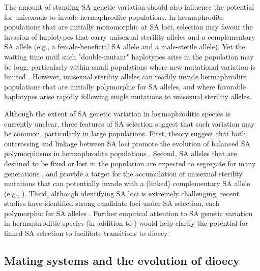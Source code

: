 \documentclass{article}
\begin{document}
The amount of standing SA genetic variation should also influence the potential for unisexuals to invade hermaphrodite populations. In hermaphrodite populations that are initially monomorphic at SA loci, selection may favour the invasion of haplotypes that carry unisexual sterility alleles and a complementary SA allele (e.g., a female-beneficial SA allele and a male-sterile allele). Yet the waiting time until such "double-mutant" haplotypes arise in the population may be long, particularly within small populations where new mutational variation is limited \citep{WeinreichChao2005,ConnallonClark2010}. However, unisexual sterility alleles can readily invade hermaphrodite populations that are initially polymorphic for SA alleles, and where favorable haplotypes arise rapidly following single mutations to unisexual sterility alleles. 

Although the extent of SA genetic variation in hermaphroditic species is currently unclear, three features of SA selection suggest that such variation may be common, particularly in large populations. First, theory suggest that both outcrossing and linkage between SA loci promote the evolution of balanced SA polymorphisms in hermaphrodite populations \citep{ JordanConnallon2014,Olito2016}. Second, SA alleles that are destined to be fixed or lost in the population are expected to segregate for many generations \citep{ConnallonClark2012}, and provide a target for the accumulation of unisexual sterility mutations that can potentially invade with a (linked) complementary SA allele (e.g., \citealt{WeinreichChao2005}). Third, although identifying SA loci is extremely challenging, recent studies have identified strong candidate loci under SA selection, each polymorphic for SA alleles \citep{Barson2015,LeeKelly2015, Mank2017}. Further empirical attention to SA genetic variation in hermaphroditic species (in addition to \citealt{LeeKelly2015}) would help clarify the potential for linked SA selection to facilitate transitions to dioecy.


\subsection*{Mating systems and the evolution of dioecy}
\end{document}
